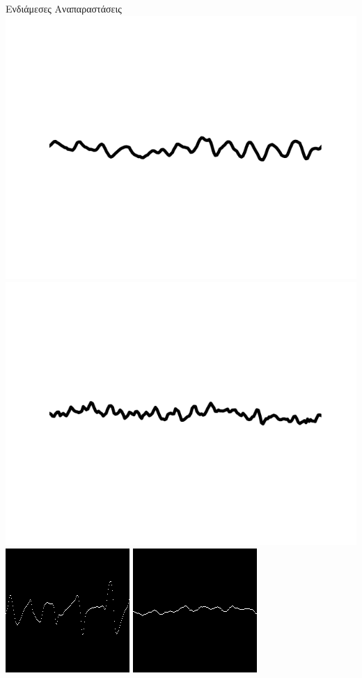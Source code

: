 \documentclass{beamer}
\begin{document}
\begin{frame}[c]{Ενδιάμεσες Αναπαραστάσεις}
	\includegraphics[scale=0.1]{signal_tumor_area.png}
	\includegraphics[scale=0.1]{signal_epilepsy.png}
	\\
	\includegraphics[scale=0.26]{signal_as_image_eyes_open.png}
	\includegraphics[scale=0.26]{signal_as_image_eyes_closed.png}

\end{frame}
\end{document}
